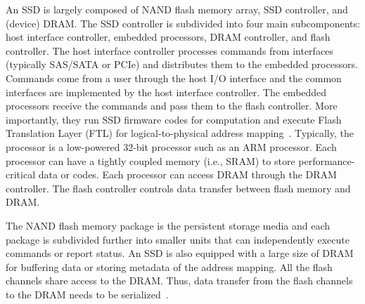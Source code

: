 An SSD is largely composed of NAND flash memory array, SSD controller, and (device) DRAM. The SSD controller is subdivided into four main subcomponents: host interface controller, embedded processors, DRAM controller, and flash controller.
The host interface controller processes commands from interfaces (typically SAS/SATA or PCIe) and distributes them to the embedded processors. Commands come from a user through the host I/O interface and the common interfaces are implemented by the host interface controller.
The embedded processors receive the commands and pass them to the flash controller. More importantly, they run SSD firmware codes for computation and execute Flash Translation Layer (FTL) for logical-to-physical address mapping~\cite{JSA:FTL:2009,CFTL:MASCOTS:2011}. Typically, the processor is a low-powered 32-bit processor such as an ARM processor. Each processor can have a tightly coupled memory (i.e., SRAM) to store performance-critical data or codes. Each processor can access DRAM through the DRAM controller. The flash controller controls data transfer between flash memory and DRAM.


The NAND flash memory package is the persistent storage media and each package is subdivided further into smaller units that can independently execute commands or report status.
An SSD is also equipped with a large size of DRAM for buffering data or storing metadata of the address mapping. All the flash channels share access to the DRAM. Thus, data transfer from the flash channels to the DRAM needs to be serialized~\cite{SmartSSD:SIGMOD:2013}.







